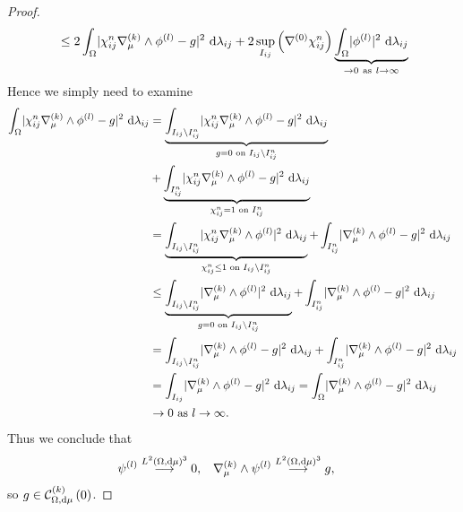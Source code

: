 \begin{proof}
\begin{align*}
		&\leq 2\int_{\Omega}\lvert \chi_{ij}^n\nabla_{\mu}^{(k)}\wedge\phi^{(l)} - g \rvert^2 \ \mathrm{d}\lambda_{ij} + 2\sup_{I_{ij}}\left( \nabla^{(0)}\chi_{ij}^n \right)\underbrace{\int_{\Omega}\lvert \phi^{(l)} \rvert^2 \ \mathrm{d}\lambda_{ij}}_{\rightarrow0 \ \text{as} \ l \rightarrow\infty} \\
	\end{align*}
	Hence we simply need to examine
	\begin{align*}
		\int_{\Omega}\lvert \chi_{ij}^n\nabla_{\mu}^{(k)}\wedge\phi^{(l)} - g \rvert^2 \ \mathrm{d}\lambda_{ij}
		&= \underbrace{\int_{I_{ij}\setminus I_{ij}^n}\lvert \chi_{ij}^n\nabla_{\mu}^{(k)}\wedge\phi^{(l)} - g \rvert^2 \ \mathrm{d}\lambda_{ij}}_{g=0 \text{ on } I_{ij}\setminus I_{ij}^n} \\
		&+ \underbrace{\int_{I_{ij}^n}\lvert \chi_{ij}^n\nabla_{\mu}^{(k)}\wedge\phi^{(l)} - g \rvert^2 \ \mathrm{d}\lambda_{ij}}_{\chi_{ij}^n=1 \text{ on } I_{ij}^n} \\
		&= \underbrace{\int_{I_{ij}\setminus I_{ij}^n}\lvert \chi_{ij}^n\nabla_{\mu}^{(k)}\wedge\phi^{(l)} \rvert^2 \ \mathrm{d}\lambda_{ij}}_{\chi_{ij}^n\leq 1 \text{ on } I_{ij}\setminus I_{ij}^n} 
		+ \int_{I_{ij}^n}\lvert \nabla_{\mu}^{(k)}\wedge\phi^{(l)} - g \rvert^2 \ \mathrm{d}\lambda_{ij} \\
		&\leq \underbrace{\int_{I_{ij}\setminus I_{ij}^n}\lvert \nabla_{\mu}^{(k)}\wedge\phi^{(l)} \rvert^2 \ \mathrm{d}\lambda_{ij}}_{g=0 \text{ on } I_{ij}\setminus I_{ij}^n} 
		+ \int_{I_{ij}^n}\lvert \nabla_{\mu}^{(k)}\wedge\phi^{(l)} - g \rvert^2 \ \mathrm{d}\lambda_{ij} \\
		&= \int_{I_{ij}\setminus I_{ij}^n}\lvert \nabla_{\mu}^{(k)}\wedge\phi^{(l)} - g \rvert^2 \ \mathrm{d}\lambda_{ij} 
		+ \int_{I_{ij}^n}\lvert \nabla_{\mu}^{(k)}\wedge\phi^{(l)} - g \rvert^2 \ \mathrm{d}\lambda_{ij} \\
		&= \int_{I_{ij}}\lvert \nabla_{\mu}^{(k)}\wedge\phi^{(l)} - g \rvert^2 \ \mathrm{d}\lambda_{ij}
		= \int_{\Omega}\lvert \nabla_{\mu}^{(k)}\wedge\phi^{(l)} - g \rvert^2 \ \mathrm{d}\lambda_{ij} \\
		&\rightarrow0 \ \text{as} \ l \rightarrow\infty.
	\end{align*}
	Thus we conclude that
	\begin{align*}
		\psi^{(l)} \overset{L^{2}\left( \Omega,\mathrm{d}\mu \right)^3}{\longrightarrow} 0, &\quad \nabla_{\mu}^{(k)}\wedge\psi^{(l)} \overset{L^{2}\left( \Omega,\mathrm{d}\mu \right)^3}{\longrightarrow} g,
	\end{align*}
	so $g\in\mathcal{C}_{ \Omega, \mathrm{d}\mu}^{(k)}\left( 0 \right)$.
\end{proof}

